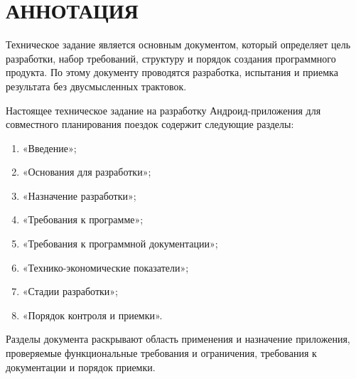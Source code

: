 \documentclass[12pt,a4paper]{article}
\begin{document}
\section*{АННОТАЦИЯ}
Техническое задание является основным документом, который определяет цель разработки,
набор требований, структуру и порядок создания программного продукта. По этому документу
проводятся разработка, испытания и приемка результата без двусмысленных трактовок.

Настоящее техническое задание на разработку Андроид-приложения для совместного
планирования поездок содержит следующие разделы:
\begin{enumerate}
  \item «Введение»;
  \item «Основания для разработки»;
  \item «Назначение разработки»;
  \item «Требования к программе»;
  \item «Требования к программной документации»;
  \item «Технико-экономические показатели»;
  \item «Стадии разработки»;
  \item «Порядок контроля и приемки».
\end{enumerate}

Разделы документа раскрывают область применения и назначение приложения, проверяемые
функциональные требования и ограничения, требования к документации и порядок приемки.

\clearpage
\end{document}
